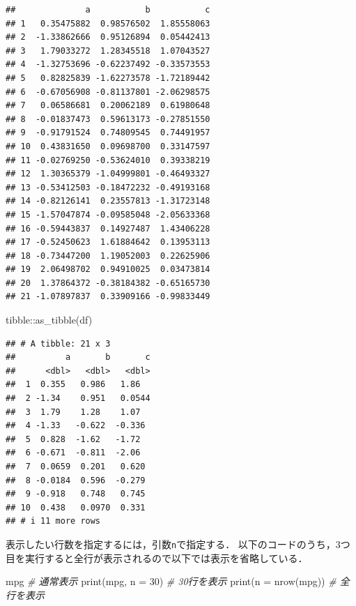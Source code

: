 \documentclass[
]{article}
\newenvironment{Shaded}{\begin{snugshade}}{\end{snugshade}}
\newcommand{\AttributeTok}[1]{\textcolor[rgb]{0.77,0.63,0.00}{#1}}
\newcommand{\CommentTok}[1]{\textcolor[rgb]{0.56,0.35,0.01}{\textit{#1}}}
\newcommand{\DecValTok}[1]{\textcolor[rgb]{0.00,0.00,0.81}{#1}}
\newcommand{\FunctionTok}[1]{\textcolor[rgb]{0.00,0.00,0.00}{#1}}
\newcommand{\NormalTok}[1]{#1}
\newcommand{\SpecialCharTok}[1]{\textcolor[rgb]{0.00,0.00,0.00}{#1}}
\begin{document}
\begin{verbatim}
##              a           b           c
## 1   0.35475882  0.98576502  1.85558063
## 2  -1.33862666  0.95126894  0.05442413
## 3   1.79033272  1.28345518  1.07043527
## 4  -1.32753696 -0.62237492 -0.33573553
## 5   0.82825839 -1.62273578 -1.72189442
## 6  -0.67056908 -0.81137801 -2.06298575
## 7   0.06586681  0.20062189  0.61980648
## 8  -0.01837473  0.59613173 -0.27851550
## 9  -0.91791524  0.74809545  0.74491957
## 10  0.43831650  0.09698700  0.33147597
## 11 -0.02769250 -0.53624010  0.39338219
## 12  1.30365379 -1.04999801 -0.46493327
## 13 -0.53412503 -0.18472232 -0.49193168
## 14 -0.82126141  0.23557813 -1.31723148
## 15 -1.57047874 -0.09585048 -2.05633368
## 16 -0.59443837  0.14927487  1.43406228
## 17 -0.52450623  1.61884642  0.13953113
## 18 -0.73447200  1.19052003  0.22625906
## 19  2.06498702  0.94910025  0.03473814
## 20  1.37864372 -0.38184382 -0.65165730
## 21 -1.07897837  0.33909166 -0.99833449
\end{verbatim}

\begin{Shaded}
\begin{Highlighting}[]
\NormalTok{tibble}\SpecialCharTok{::}\FunctionTok{as\_tibble}\NormalTok{(df)}
\end{Highlighting}
\end{Shaded}

\begin{verbatim}
## # A tibble: 21 x 3
##          a       b       c
##      <dbl>   <dbl>   <dbl>
##  1  0.355   0.986   1.86  
##  2 -1.34    0.951   0.0544
##  3  1.79    1.28    1.07  
##  4 -1.33   -0.622  -0.336 
##  5  0.828  -1.62   -1.72  
##  6 -0.671  -0.811  -2.06  
##  7  0.0659  0.201   0.620 
##  8 -0.0184  0.596  -0.279 
##  9 -0.918   0.748   0.745 
## 10  0.438   0.0970  0.331 
## # i 11 more rows
\end{verbatim}

表示したい行数を指定するには，引数\texttt{n}で指定する．
以下のコードのうち，3つ目を実行すると全行が表示されるので以下では表示を省略している．

\begin{Shaded}
\begin{Highlighting}[]
\NormalTok{mpg                  }\CommentTok{\# 通常表示}
\FunctionTok{print}\NormalTok{(mpg, }\AttributeTok{n =} \DecValTok{30}\NormalTok{)   }\CommentTok{\# 30行を表示}
\FunctionTok{print}\NormalTok{(}\AttributeTok{n =} \FunctionTok{nrow}\NormalTok{(mpg)) }\CommentTok{\# 全行を表示}
\end{Highlighting}
\end{Shaded}
\end{document}

